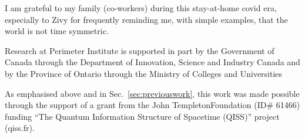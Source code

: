 \documentclass[10pt]{article}
\begin{document}
I am grateful to my family (co-workers) during this stay-at-home covid era, especially to Zivy for frequently reminding me, with simple examples, that the world is not time symmetric.

Research at Perimeter Institute is supported in part by the Government
of Canada through the Department of Innovation, Science and Industry Canada and by the Province of Ontario through the Ministry of Colleges and Universities

As emphasised above and in Sec.\ \ref{sec:previouswork}, this work was made possible through the support of a grant from the John TempletonFoundation (ID\# 61466) funding “The Quantum Information Structure of Spacetime (QISS)” project (qiss.fr).


{}

\end{document}
